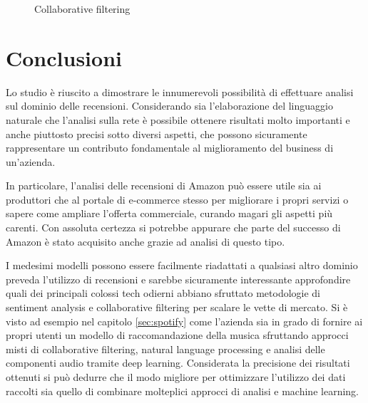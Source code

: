 \documentclass[hidelinks, 12pt]{article}
\begin{document}
\begin{figure}[H]
	\centering
	\caption[Collaborative filtering]{Collaborative filtering}
	\label{fig:collaborative_filtering_ui}
\end{figure}

\clearpage



\section{Conclusioni}

Lo studio è riuscito a dimostrare le innumerevoli possibilità di effettuare analisi sul dominio delle recensioni. Considerando sia l'elaborazione del linguaggio naturale che l'analisi sulla rete è possibile ottenere risultati molto importanti e anche piuttosto precisi sotto diversi aspetti, che possono sicuramente rappresentare un contributo fondamentale al miglioramento del business di un'azienda.

In particolare, l'analisi delle recensioni di Amazon può essere utile sia ai produttori che al portale di e-commerce stesso per migliorare i propri servizi o sapere come ampliare l'offerta commerciale, curando magari gli aspetti più carenti. Con assoluta certezza si potrebbe appurare che parte del successo di Amazon è stato acquisito anche grazie ad analisi di questo tipo.

I medesimi modelli possono essere facilmente riadattati a qualsiasi altro dominio preveda l'utilizzo di recensioni e sarebbe sicuramente interessante approfondire quali dei principali colossi tech odierni abbiano sfruttato metodologie di sentiment analysis e collaborative filtering per scalare le vette di mercato. Si è visto ad esempio nel capitolo \ref{sec:spotify} come l'azienda sia in grado di fornire ai propri utenti un modello di raccomandazione della musica sfruttando approcci misti di collaborative filtering, natural language processing e analisi delle componenti audio tramite deep learning. Considerata la precisione dei risultati ottenuti si può dedurre che il modo migliore per ottimizzare l'utilizzo dei dati raccolti sia quello di combinare molteplici approcci di analisi e machine learning.




\newpage


	
\end{document}
